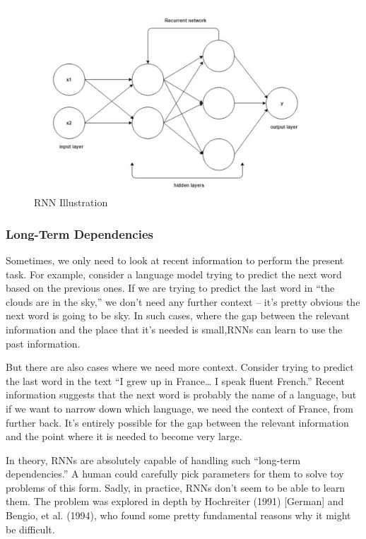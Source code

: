 \begin{figure}[ht]
    \centering
    \includegraphics[scale=0.3]{Images/recurrent-nets.png}
    \caption{RNN Illustration}
    \label{fig:rnnI}
\end{figure}


\subsubsection{Long-Term Dependencies}

Sometimes, we only need to look at recent information to perform the present task. For example, consider a language model trying to predict the next word based on the previous ones. If we are trying to predict the last word in “the clouds are in the sky,” we don’t need any further context – it’s pretty obvious the next word is going to be sky. In such cases, where the gap between the relevant information and the place that it’s needed is small,RNNs can learn to use the past information.


But there are also cases where we need more context. Consider trying to predict the last word in the text “I grew up in France… I speak fluent French.”
Recent information suggests that the next word is probably the name of a language, but if we want to narrow down which language, we need the context of France, from further back. It’s entirely possible for the gap between the relevant information and the point where it is needed to become very large.


In theory, RNNs are absolutely capable of handling such “long-term dependencies.” A human could carefully pick parameters for them to solve toy problems of this form. Sadly, in practice, RNNs don’t seem to be able to learn them. The problem was explored in depth by Hochreiter (1991) [German] and Bengio, et al. (1994), who found some pretty fundamental reasons why it might be difficult.

